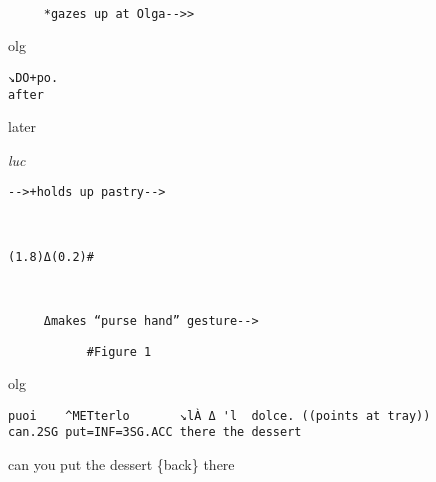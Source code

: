 \documentclass[output=paper,modfonts]{langscibook}
\begin{document}
%
\begin{transbox}{6}{~}
\begin{verbatim}
     *gazes up at Olga-->>
\end{verbatim}
\end{transbox}\vspace{-1mm}
%
\begin{mdframednoverticalspace}[style=firstfoc]
\begin{transbox}{7}{olg}
\begin{verbatim}
↘DO+po.
after
\end{verbatim}
later
\end{transbox}
\end{mdframednoverticalspace}\vspace{2mm}
%
\begin{mdframednoverticalspace}[style=secondfoc]
\begin{transbox}{8}{\textit{luc}}
\begin{verbatim}
-->+holds up pastry-->
\end{verbatim}
\end{transbox}
\end{mdframednoverticalspace}\vspace{-1mm}
%
\begin{transbox}{9}{~}
\begin{verbatim}
(1.8)Δ(0.2)#
\end{verbatim}
\end{transbox}
%
\begin{mdframednoverticalspace}[style=secondfoc]
\begin{transbox}{10}{~}
\begin{verbatim}
     Δmakes “purse hand” gesture-->
\end{verbatim}
\end{transbox}
\end{mdframednoverticalspace}%
%
\begin{transbox}{11}{\fig}
\begin{verbatim}
           #Figure 1
\end{verbatim}
\end{transbox}\vspace{-0.75mm}
%
\begin{mdframednoverticalspace}[style=firstfoc]
\begin{transbox}{12}{olg}
\begin{verbatim}
puoi    ^METterlo       ↘lÀ Δ 'l  dolce. ((points at tray))
can.2SG put=INF=3SG.ACC there the dessert
\end{verbatim}
can you put the dessert \{back\} there
\end{transbox}
\end{mdframednoverticalspace}\vspace{1mm}
\end{document}
